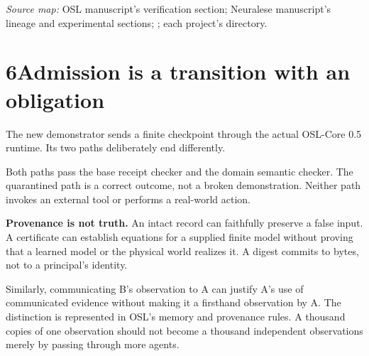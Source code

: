 \documentclass[11pt]{article}
\begin{document}
\textit{Source map:} OSL manuscript's verification section; Neuralese manuscript's lineage and experimental sections; ; each project's  directory.
\clearpage

\section*{6\quad Admission is a transition with an obligation}
The new demonstrator sends a finite checkpoint through the actual OSL-Core 0.5 runtime. Its two paths deliberately end differently.
\begin{center}
\end{center}
Both paths pass the base receipt checker and the domain semantic checker. The quarantined path is a correct outcome, not a broken demonstration. Neither path invokes an external tool or performs a real-world action.

\begin{scopebox}
\textbf{Provenance is not truth.} An intact record can faithfully preserve a false input. A certificate can establish equations for a supplied finite model without proving that a learned model or the physical world realizes it. A digest commits to bytes, not to a principal's identity.
\end{scopebox}
Similarly, communicating B's observation to A can justify A's use of communicated evidence without making it a firsthand observation by A. The distinction is represented in OSL's memory and provenance rules. A thousand copies of one observation should not become a thousand independent observations merely by passing through more agents.
\end{document}
